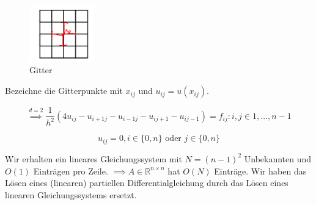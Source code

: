 \documentclass{book}
\def\R{\mathbb{R}}
\begin{document}
            \begin{figure}[H]
                \centering
                \includegraphics[width=0.25\textwidth]{Bild011}
                \caption{Gitter}
            \end{figure}

            Bezeichne die Gitterpunkte mit $x_{ij}$ und $u_{ij}=u(x_{ij})$.

            \[\stackrel{d=2}{\implies}\frac{1}{h^2}\left(4u_{ij}-u_{i+1j}-u_{i-1j}-u_{ij+1}-u_{ij-1}\right)=f_{ij}:i,j\in1,\dots,n-1\] 

            \[u_{ij}=0,i\in\{0,n\}\text{ oder }j\in\{0,n\}\]

            Wir erhalten ein lineares Gleichungssystem mit $N=(n-1)^2$ Unbekannten und $O(1)$ Einträgen pro Zeile. 
            $\implies A\in\R^{n\times n}$ hat $O(N)$ Einträge. Wir haben das Lösen eines (linearen) partiellen Differentialgleichung durch das Lösen eines linearen 
            Gleichungssystems ersetzt.
\end{document}
